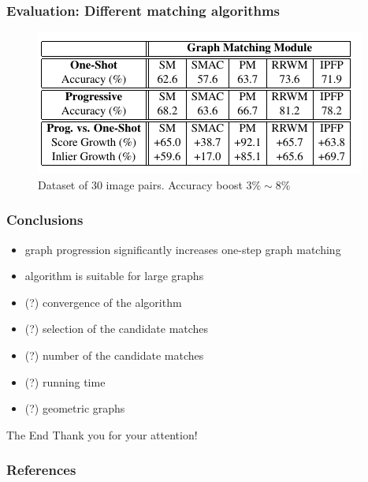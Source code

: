 \documentclass[hyperref={pdfpagelabels=false}]{beamer}
\begin{document}
\begin{frame}
 \frametitle{Evaluation: Different matching algorithms}
 \begin{figure}
  \includegraphics[scale=0.7]{fig_table1.png}
  \caption{Dataset of $30$ image pairs. Accuracy boost $3\%\sim 8\%$}
 \end{figure}

\end{frame}


\begin{frame}
 \frametitle{Conclusions}
 \begin{itemize}
  \item graph progression significantly increases one-step graph matching
  \item algorithm is suitable for large graphs
  \vspace{30pt}
  
  \item (?) convergence of the algorithm
  \item (?) selection of the candidate matches
  \item (?) number of the candidate matches
  \item (?) running time
  \item (?) geometric graphs
 \end{itemize}

\end{frame}

\begin{frame}{The End}
\centering
\LARGE
\color{red}
 Thank you for your attention!
 
 \nocite{MinsuChoSubb}
\end{frame}

\begin{frame} [allowframebreaks]
	\frametitle{References}
	
	
\end{frame} 
\end{document}
